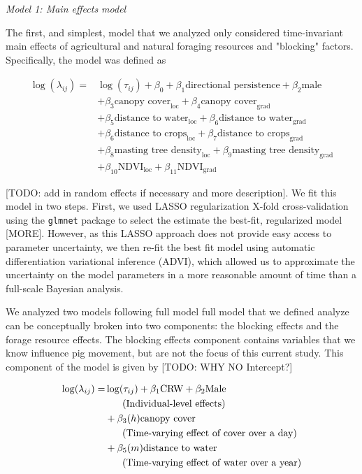 \documentclass[a4paper]{article}
\begin{document}
\noindent
\emph{Model 1: Main effects model}

The first, and simplest, model that we analyzed only considered time-invariant main effects of agricultural and natural foraging resources and "blocking" factors.  Specifically, the model was defined as

\begin{align}
  \log(\lambda_{ij}) = & \log(\tau_{ij}) + \beta_0 +  \beta_1 \text{directional persistence} + \beta_2 \text{male  } \\
  & + \beta_{3} \text{canopy cover}_{\text{loc}} + \beta_{4} \text{canopy cover}_{\text{grad}} \\
  & + \beta_5 \text{distance to water}_{\text{loc}} + \beta_6 \text{distance to water}_{\text{grad}} \\
  & + \beta_6\text{distance to crops}_{\text{loc}} + \beta_7\text{distance to crops}_{\text{grad}} \\
  & + \beta_8\text{masting tree density}_{\text{loc}} + \beta_9\text{masting tree density}_{\text{grad}} \\
  & + \beta_{10}\text{NDVI}_{\text{loc}} + \beta_{11}\text{NDVI}_{\text{grad}}
\end{align}

[TODO: add in random effects if necessary and more description].  We fit this model in two steps.  First, we used LASSO regularization X-fold cross-validation using the \texttt{glmnet} package to select the estimate the best-fit, regularized model [MORE]. However, as this LASSO approach does not provide easy access to parameter uncertainty, we then re-fit the best fit model using automatic differentiation variational inference (ADVI), which allowed us to approximate the uncertainty on the model parameters in a more reasonable amount of time than a full-scale Bayesian analysis.





We analyzed two models following full model  full model that we defined analyze  can be conceptually broken into two components: the blocking effects and the forage resource effects.  The blocking effects component contains variables that we know influence pig movement, but are not the focus of this current study.  This component of the model is given by [TODO: WHY NO Intercept?]

\begin{align}
  \log(\lambda_{ij}) = & \log(\tau_{ij}) + \beta_1 \text{CRW} + \beta_2 \text{Male  } \\
  &\text{\hspace{0.5cm}   (Individual-level effects)} \\
  & + \beta_{3}(h) \text{canopy cover} \\
  &\text{\hspace{0.5cm}   (Time-varying effect of cover over a day)} \\
  & + \beta_5(m) \text{distance to water  } \\
  & \text{\hspace{0.5cm}    (Time-varying effect of water over a year)}
 \end{align}
\end{document}

